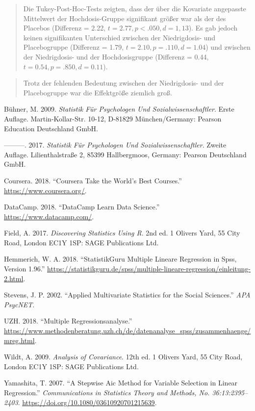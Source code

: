\documentclass[]{article}
\begin{document}
\begin{quote}
Die Tukey-Post-Hoc-Tests zeigten, dass der über die Kovariate angepasste Mittelwert der Hochdosis-Gruppe signifikant größer war als der des Placebos (Differenz = 2.22, \(t = 2.77, p < .050, d = 1,13\)). Es gab jedoch keinen signifikanten Unterschied zwischen der Niedrigdosis- und Placebogruppe (Differenz = 1.79, \(t = 2.10, p = .110, d = 1.04\)) und zwischen der Niedrigdosis- und der Hochdosisgruppe (Differenz = 0.44, \(t = 0.54, p = .850, d = 0.11\)).
\end{quote}

\begin{quote}
Trotz der fehlenden Bedeutung zwischen der Niedrigdosis- und der Placebogruppe war die Effektgröße ziemlich groß.
\end{quote}

\hypertarget{refs}{}
\leavevmode\hypertarget{ref-Buhner.2009}{}%
Bühner, M. 2009. \emph{Statistik Für Psychologen Und Sozialwissenschaftler}. Erste Auflage. Martin-Kollar-Str. 10-12, D-81829 München/Germany: Pearson Education Deutschland GmbH.

\leavevmode\hypertarget{ref-Buhner.2017}{}%
---------. 2017. \emph{Statistik Für Psychologen Und Sozialwissenschaftler}. Zweite Auflage. Lilienthalstraße 2, 85399 Hallbergmoos, Germany: Pearson Deutschland GmbH.

\leavevmode\hypertarget{ref-Coursera.2018}{}%
Coursera. 2018. ``Coursera Take the World's Best Courses.'' \url{https://www.coursera.org/}.

\leavevmode\hypertarget{ref-DataCamp.2018}{}%
DataCamp. 2018. ``DataCamp Learn Data Science.'' \url{https://www.datacamp.com/}.

\leavevmode\hypertarget{ref-Field.2017}{}%
Field, A. 2017. \emph{Discovering Statistics Using R}. 2nd ed. 1 Olivers Yard, 55 City Road, London EC1Y 1SP: SAGE Publications Ltd.

\leavevmode\hypertarget{ref-Hemmerich.2018}{}%
Hemmerich, W. A. 2018. ``StatistikGuru Multiple Lineare Regression in Spss, Version 1.96.'' \url{https://statistikguru.de/spss/multiple-lineare-regression/einleitung-2.html}.

\leavevmode\hypertarget{ref-Stevens.2002}{}%
Stevens, J. P. 2002. ``Applied Multivariate Statistics for the Social Sciences.'' \emph{APA PsycNET}.

\leavevmode\hypertarget{ref-UZH.2018}{}%
UZH. 2018. ``Multiple Regressionsanalyse.'' \url{https://www.methodenberatung.uzh.ch/de/datenanalyse_spss/zusammenhaenge/mreg.html}.

\leavevmode\hypertarget{ref-Wildt.2009}{}%
Wildt, A. 2009. \emph{Analysis of Covariance}. 12th ed. 1 Olivers Yard, 55 City Road, London EC1Y 1SP: SAGE Publications Ltd.

\leavevmode\hypertarget{ref-Yamashita.2007}{}%
Yamashita, T. 2007. ``A Stepwise Aic Method for Variable Selection in Linear Regression.'' \emph{Communications in Statistics Theory and Methods, No. 36:13:2395--2403}. \url{https://doi.org/10.1080/03610920701215639}.
\end{document}
